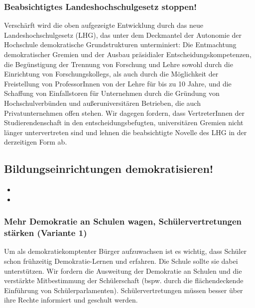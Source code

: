 \subsubsection{Beabsichtigtes Landeshochschulgesetz stoppen!}
\abstimmung
Verschärft wird die oben aufgezeigte Entwicklung durch das neue Landeshochschulgesetz (LHG), das unter dem Deckmantel der Autonomie der Hochschule demokratische Grundstrukturen unterminiert: Die Entmachtung demokratischer Gremien und der Ausbau präsidialer Entscheidungskompetenzen, die Begünstigung der Trennung von Forschung und Lehre sowohl durch die Einrichtung von Forschungskollegs, als auch durch die Möglichkeit der Freistellung von ProfessorInnen von der Lehre für bis zu 10 Jahre, und die Schaffung von Einfallstoren für Unternehmen durch die Gründung von Hochschulverbünden und außeruniversitären Betrieben, die auch Privatunternehmen offen stehen. Wir dagegen fordern, dass VertreterInnen der Studierendenschaft in den entscheidungsbefugten, universitären Gremien nicht länger untervertreten sind und lehnen die beabsichtigte Novelle des LHG in der derzeitigen Form ab.
 
\subsection*{Bildungseinrichtungen demokratisieren!}
\label{wp:bildung:demokratie2}
\begin{itemize}
\item {}
\item {}
\end{itemize}

\subsubsection{Mehr Demokratie an Schulen wagen, Schülervertretungen stärken (Variante 1)}
\abstimmung
Um als demokratiekomptenter Bürger aufzuwachsen ist es wichtig, dass Schüler schon frühzeitig Demokratie-Lernen und erfahren. Die Schule sollte sie dabei unterstützen. Wir fordern die Ausweitung der Demokratie an Schulen und die verstärkte Mitbestimmung der Schülerschaft (bspw. durch die flächendeckende Einführung von Schülerparlamenten). Schülervertretungen müssen besser über ihre Rechte informiert und geschult werden.

